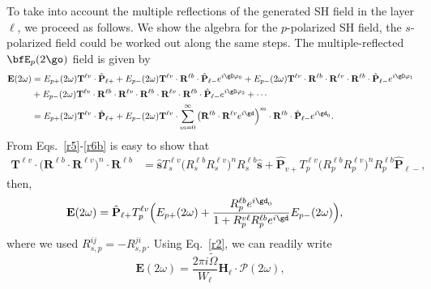 \documentclass[aps,11pt]{revtex4}
\begin{document}
To take into account the multiple reflections of the generated SH
field in the layer $\ell$, we proceed as follows. We show the algebra
for the $p$-polarized SH field, the $s$-polarized field could be
worked out along the same steps. The multiple-reflected $\bfE_p(2\go)$
field is given by
\begin{equation}\label{m7}
\begin{split}
\mathbf{E}(2\omega) 
&=  
E_{p+}(2\omega)\mathbf{T}^{\ell v}\cdot\hat{\mathbf{P}}_{\ell +}
+ E_{p-}(2\omega)\mathbf{T}^{\ell v}
\cdot\mathbf{R}^{\ell b}\cdot\hat{\mathbf{P}}_{\ell-}e^{i\gD\varphi_0}
+ E_{p-}(2\omega)\mathbf{T}^{\ell v}
\cdot\mathbf{R}^{\ell b}\cdot\mathbf{R}^{\ell v}
\cdot\mathbf{R}^{\ell b}\cdot\hat{\mathbf{P}}_{\ell-}e^{i\gD\varphi_1}
\\
&
+ E_{p-}(2\omega)\mathbf{T}^{\ell v}
\cdot\mathbf{R}^{\ell b}\cdot\mathbf{R}^{\ell v}
\cdot\mathbf{R}^{\ell b}\cdot\mathbf{R}^{\ell v}
\cdot\mathbf{R}^{\ell b}\cdot\hat{\mathbf{P}}_{\ell-}e^{i\gD\varphi_2}
+\cdots 
\\
&= 
E_{p+}(2\omega)\mathbf{T}^{\ell v}\cdot\hat{\mathbf{P}}_{\ell +}
+ E_{p-}(2\omega) \mathbf{T}^{\ell v}
\cdot\sum_{m=0}^\infty  
\big(
\mathbf{R}^{\ell b}\cdot\mathbf{R}^{\ell v} 
e^{i\gd}\Big)^m 
\cdot\mathbf{R}^{\ell b}\cdot\hat{\mathbf{P}}_{\ell-}e^{i\gd_0}
.
\end{split}
\end{equation} 
From Eqs.~\eqref{r5}-\eqref{r6b} is easy to show
that
\begin{align}\label{m1}
\mathbf{T}^{\ell v}\cdot 
\Big(\mathbf{R}^{\ell b}\cdot\mathbf{R}^{\ell v}\Big)^n 
\cdot \mathbf{R}^{\ell b}
&=
\hat{\mathbf{s}}
T^{\ell v}_s\Big(R^{\ell b}_sR^{\ell v}_s\Big)^n 
 R^{\ell b}_s 
\hat{\mathbf{s}}
+
\hat{\mathbf{P}}_{v+}
T^{\ell v}_p\Big(R^{\ell b}_pR^{\ell v}_p\Big)^n 
 R^{\ell b}_p 
\hat{\mathbf{P}}_{\ell-}
,
\end{align}
then,
\begin{equation}\label{m7}
\begin{split}
\mathbf{E}(2\omega) 
&= 
\hat{\mathbf{P}}_{\ell +}T^{\ell v}_p
\Big(
E_{p+}(2\omega) 
+
\frac{R^{\ell b}_pe^{i\gd_0}}{1+R^{v\ell}_pR^{\ell b}_pe^{i\gd}}
E_{p-}(2\omega) 
\Big)
,
\end{split}
\end{equation}
where we used $R^{ij}_{s,p}=-R^{ji}_{s,p}$.
Using Eq.~\eqref{r2}, we can readily write
\begin{equation}\label{mr8}
\mathbf{E}(2\omega) = \frac{2\pi i\tilde{\Omega}}{W_{\ell}}
\mathbf{H}_{\ell}\cdot\boldsymbol{\mathcal{P}}(2\omega),
\end{equation}
\end{document}

